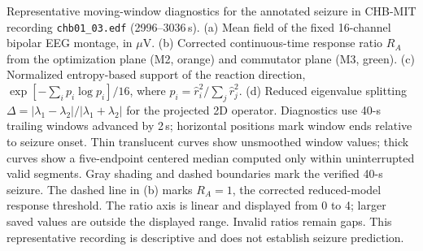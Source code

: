 \caption{Representative moving-window diagnostics for the annotated seizure in CHB-MIT recording \texttt{chb01\_03.edf} (2996--3036\,s). (a) Mean field of the fixed 16-channel bipolar EEG montage, in \(\mu\mathrm V\). (b) Corrected continuous-time response ratio \(R_A\) from the optimization plane (M2, orange) and commutator plane (M3, green). (c) Normalized entropy-based support of the reaction direction, \(\exp[-\sum_i p_i\log p_i]/16\), where \(p_i=\hat r_i^2/\sum_j\hat r_j^2\). (d) Reduced eigenvalue splitting \(\Delta=|\lambda_1-\lambda_2|/|\lambda_1+\lambda_2|\) for the projected 2D operator. Diagnostics use 40-s trailing windows advanced by 2\,s; horizontal positions mark window ends relative to seizure onset. Thin translucent curves show unsmoothed window values; thick curves show a five-endpoint centered median computed only within uninterrupted valid segments. Gray shading and dashed boundaries mark the verified 40-s seizure. The dashed line in (b) marks \(R_A=1\), the corrected reduced-model response threshold. The ratio axis is linear and displayed from 0 to 4; larger saved values are outside the displayed range. Invalid ratios remain gaps. This representative recording is descriptive and does not establish seizure prediction.}
